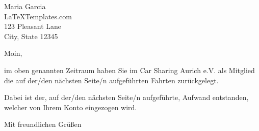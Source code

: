 \documentclass[
	pagenumber=false, %
	parskip=half, %
	fromalign=right, %
	foldmarks=true, %
	addrfield=true %
	firstfoot=on %
    ]{scrlttr2}
\date{5. August 2017} %
\begin{document}
 
\begin{letter}{Maria Garcia \\ LaTeXTemplates.com \\ 123 Pleasant Lane \\ City, State 12345} %


\opening{Moin,}

im oben genannten Zeitraum haben Sie im Car Sharing Aurich e.V. als Mitglied die auf der/den nächsten Seite/n aufgeführten Fahrten zurückgelegt.

Dabei ist der, auf der/den nächsten Seite/n aufgeführte, Aufwand entstanden, welcher von Ihrem Konto eingezogen wird.

\closing{Mit freundlichen Grüßen}




\end{letter}
\end{document}
